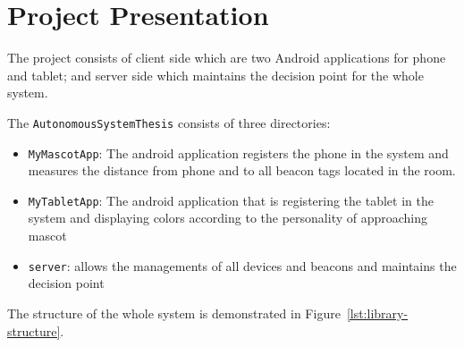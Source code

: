 \section{Project Presentation}
\label{sec:project-presentation}
The project consists of client side which are two Android applications for phone and tablet;
and server side which maintains the decision point for the whole system.

The \texttt{AutonomousSystemThesis} consists of three directories:

\begin{itemize}
    \item \texttt{MyMascotApp}: The android application registers the phone in the system and measures the distance
    from phone and to all beacon tags located in the room.
    \item \texttt{MyTabletApp}: The android application that is registering the tablet in the system and displaying colors according to the personality of approaching mascot
    \item \texttt{server}: allows the managements of all devices and beacons and maintains the decision point
\end{itemize}

The structure of the whole system is demonstrated in Figure~\ref{lst:library-structure}.

